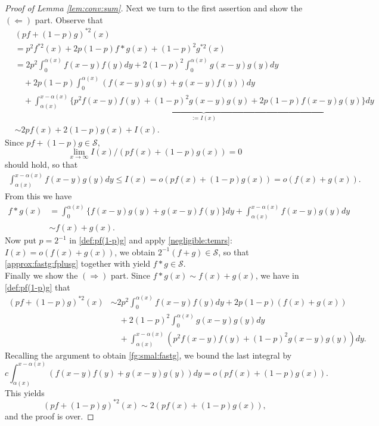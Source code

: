 \documentclass[12pt,leqno]{amsart}
\newcommand{\cals}{{\mathcal S}}
\newcommand{\1}{{\mathbf 1}}
\begin{document}
\begin{proof}[Proof of Lemma \ref{lem:conv:sum}]
Next we turn to the first assertion and show the $(\Leftarrow)$ part. 
Observe that  
\begin{align}
\label{def:pf(1-p)g}
& (pf+(1-p)g)^{\ast 2}(x) \\
&= p^2 f^{\ast 2}(x) + 2p(1-p) f\ast g(x) +(1-p)^2 g^{\ast 2}(x) \nonumber \\
&= 2 p^2 \int_0^{\alpha(x)} f(x-y) f(y)dy + 2(1-p)^2 \int_0^{\alpha(x)} g(x-y) g(y)dy \nonumber \\
&\quad + 2p(1-p)\int_0^{\alpha(x)} (f(x-y)g(y)+g(x-y)f(y))dy \nonumber \\
&\quad + \underbrace{\int_{\alpha(x)}^{x-\alpha(x)} \big\{p^2f(x-y)f(y)+(1-p)^2g(x-y)g(y)
+2p(1-p)f(x-y)g(y)
\big\}dy}_{:= I(x)} \nonumber \\
& \sim 2pf(x)+2(1-p)g(x)+I(x). \nonumber
\end{align}
Since $pf+(1-p)g\in \cals $,  
\[
 \lim_{x\to\infty} I(x)/(pf(x)+(1-p)g(x)) =0
\]
should hold, so that 
\begin{align}
\label{negligible:temrs}
 \int_{\alpha(x)}^{x-\alpha(x)} f(x-y)g(y)dy \le I(x) =o(pf(x)+(1-p)g(x))=o(f(x)+g(x)). 
\end{align}
From this we have 
\begin{align}
\label{approx:fastg:fplusg}
 f\ast g(x) &= \int_{0}^{\alpha(x)}\{ f(x-y)g(y)+g(x-y)f(y)\} dy + \int_{\alpha(x)}^{x-\alpha(x)} f(x-y)g(y)dy \\
&\sim f(x)+g(x). \nonumber 
\end{align}
Now put $p=2^{-1}$ in \eqref{def:pf(1-p)g} and apply \eqref{negligible:temrs}: $I(x)=o(f(x)+g(x))$, we obtain 
$2^{-1}(f+g) \in \cals$,
so that %
\eqref{approx:fastg:fplusg} together with \cite[Theorem 4.8]{Foss:Korshunov:Zachary:2013}
yield $f\ast g \in \cals$. \\

Finally we show the $(\Rightarrow)$ part. 
Since $f\ast g(x)\sim f(x)+g(x)$, we have in \eqref{def:pf(1-p)g} that 
\begin{align*}
(pf+(1-p)g)^{\ast 2}(x) %
&\sim 2p^2 \int_{0}^{\alpha(x)} f(x-y)f(y)dy + 2p(1-p)(f(x)+g(x)) \\
&\quad + 2 (1-p)^2 \int_{0}^{\alpha(x)} g(x-y)g(y)dy \\
&\quad + \int_{\alpha(x)}^{x-\alpha(x)} (p^2 f(x-y)f(y) +(1-p)^2 g(x-y)g(y))dy.
\end{align*}
Recalling the argument to obtain \eqref{fg:smal:fastg}, 
we bound the last integral by 
\[
 c \int_{\alpha(x)}^{x-\alpha(x)} (f(x-y)f(y)+g(x-y)g(y)) dy = o(pf(x)+(1-p)g(x)). 
\]
This yields 
\[
 (pf+(1-p)g)^{\ast 2}(x) \sim 2(pf(x)+(1-p)g(x)),
\]
and the proof is over. 


\end{proof}
\end{document}
